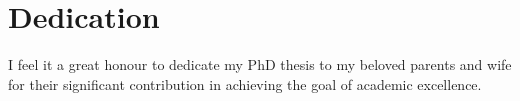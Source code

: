 \chapter*{Dedication}
I feel it a great honour to dedicate my PhD thesis to my beloved parents and wife
for their significant contribution in achieving the goal of academic excellence.
